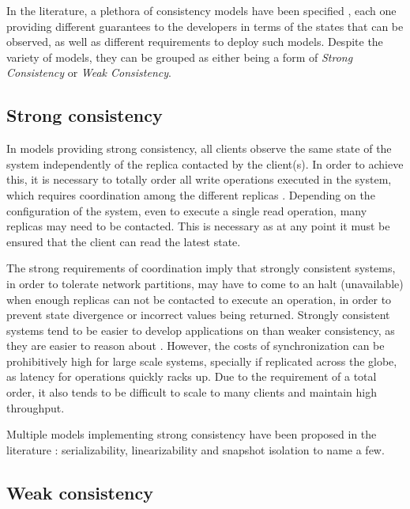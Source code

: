 In the literature, a plethora of consistency models have been specified \cite{linearizability, si, spanner, understandingEC, cops, dynamo, cassandra}, each one providing different guarantees to the developers in terms of the states that can be observed, as well as different requirements to deploy such models.
Despite the variety of models, they can be grouped as either being a form of \emph{Strong Consistency} or \emph{Weak Consistency}.

\subsection{Strong consistency}
\label{subsec:strong}

In models providing strong consistency, all clients observe the same state of the system independently of the replica contacted by the client(s).
In order to achieve this, it is necessary to totally order all write operations executed in the system, which requires coordination among the different replicas \cite{linearizability, spanner}.
Depending on the configuration of the system, even to execute a single read operation, many replicas may need to be contacted.
This is necessary as at any point it must be ensured that the client can read the latest state.

The strong requirements of coordination imply that strongly consistent systems, in order to tolerate network partitions, may have to come to an halt (unavailable) when enough replicas can not be contacted to execute an operation, in order to prevent state divergence or incorrect values being returned.
Strongly consistent systems tend to be easier to develop applications on than weaker consistency, as they are easier to reason about \cite{spanner}.
However, the costs of synchronization can be prohibitively high for large scale systems, specially if replicated across the globe, as latency for operations quickly racks up.
Due to the requirement of a total order, it also tends to be difficult to scale to many clients and maintain high throughput.

Multiple models implementing strong consistency have been proposed in the literature  \cite{linearizability, si}: serializability, linearizability and snapshot isolation to name a few.

\subsection{Weak consistency}
\label{subsec:weak}

